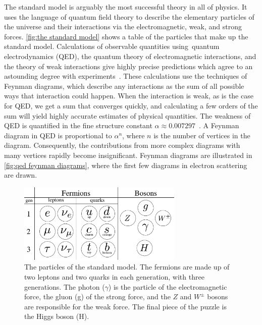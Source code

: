 The standard model is arguably the most successful theory in all of physics.
It uses the language of quantum field theory to describe the elementary particles of the universe and their interactions via the electromagnetic, weak, and strong forces.
\autoref{fig:the standard model} shows a table of the particles that make up the standard model.
Calculations of observable quantities using quantum electrodynamics (QED), the quantum theory of electromagnetic interactions, and the theory of weak interactions give highly precise predictions which agree to an astounding degree with experiments~\cite{Schwartz:QFT}.
These calculations use the techniques of Feynman diagrams, which describe any interactions as the sum of all possible ways that interaction could happen.
When the interaction is weak, as is the case for QED, we get a sum that converges quickly, and calculating a few orders of the sum will yield highly accurate estimates of physical quantities.
The weakness of QED is quantified in the fine structure constant $\alpha \approx 0.00 7297$~\cite{PDG}.
A Feynman diagram in QED is proportional to $\alpha^n$, where $n$ is the number of vertices in the diagram.
Consequently, the contributions from more complex diagrams with many vertices rapidly become insignificant.
Feynman diagrams are illustrated in \autoref{fig:qed feynman diagrams}, where the first few diagrams in electron scattering are drawn.

\begin{figure}[h]
    \centering
    \includegraphics[width=0.7\textwidth]{figurer/standard_model2.pdf}
    \caption{The particles of the standard model. The fermions are made up of two leptons and two quarks in each generation, with three generations. The photon ($\gamma$) is the particle of the electromagnetic force, the gluon (g) of the strong force, and the $Z$ and $W^\pm$ bosons are responsible for the weak force. The final piece of the puzzle is the Higgs boson (H).}
    \label{fig:the standard model}
\end{figure}

